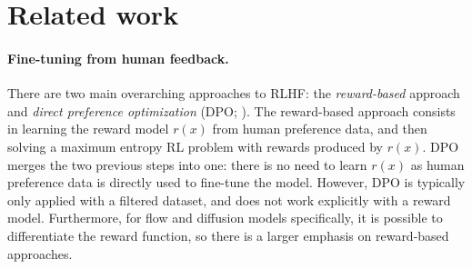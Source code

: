 \documentclass[]{fairmeta}
\begin{document}
\section{Related work} 

\paragraph{Fine-tuning from human feedback.}
There are two main overarching approaches to RLHF: the \textit{reward-based} approach \citep{ziegler2020finetuning,stiennon2020learning,ouyang2022training,bai2022training} and \textit{direct preference optimization} (DPO; \cite{rafailov2023direct}).
The reward-based approach \citep{ziegler2020finetuning,stiennon2020learning,ouyang2022training,bai2022training} consists in learning the reward model $r(x)$ from human preference data, and then solving a maximum entropy RL problem with rewards produced by $r(x)$. 
DPO merges the two previous steps into one: there is no need to learn $r(x)$ as human preference data is directly used to fine-tune the model. 
However, DPO is typically only applied with a filtered dataset, and does not work explicitly with a reward model.
Furthermore, for flow and diffusion models specifically, it is possible to differentiate the reward function, so there is a larger emphasis on reward-based approaches.
\end{document}
